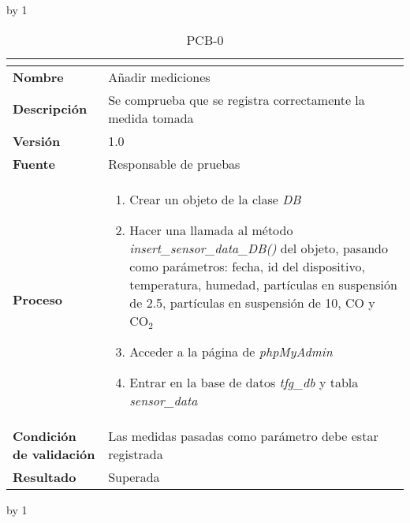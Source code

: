 \advance\pcb by 1
\begin{table}[H]
	\caption{PCB-0\number\pcb}
	\begin{tabular}{|l|p{}|}
		\hline
		\multicolumn{2}{|c|}{\cellcolor[HTML]{BFBFBF}{\color[HTML]{000000} \textbf{PCB-0\number\pcb}}} \\ \hline
		\textbf{Nombre}                  & Añadir mediciones                                           \\ \hline
		\textbf{Descripción}             & Se comprueba que se registra correctamente la medida tomada \\ \hline
		\textbf{Versión}                 & 1.0                                                         \\ \hline
		\textbf{Fuente}                  & Responsable de pruebas                                      \\ \hline
		\textbf{Proceso}                 & \begin{enumerate}
			\item Crear un objeto de la clase \textit{DB}
			\item Hacer una llamada al método \textit{insert\_sensor\_data\_DB()} del objeto, pasando como parámetros: fecha, id del dispositivo, temperatura, humedad, partículas en suspensión de 2.5, partículas en suspensión de 10, CO y CO$_2$
			\item Acceder a la página de \textit{phpMyAdmin}
			\item Entrar en la base de datos \textit{tfg\_db} y tabla \textit{sensor\_data}
		\end{enumerate}                                  \\ \hline
		\textbf{Condición de validación} & Las medidas pasadas como parámetro debe estar registrada    \\ \hline
		\textbf{Resultado}               & Superada                                                    \\ \hline
	\end{tabular}
\end{table}
\advance\pcb by 1
